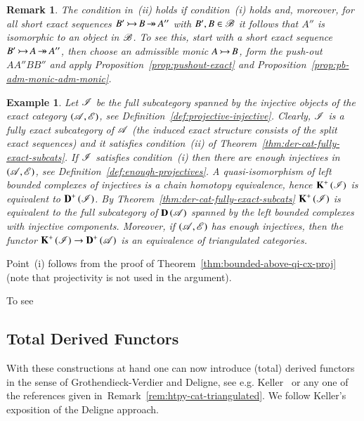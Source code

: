 \documentclass[1p]{elsarticle}
\makeatletter
\renewenvironment{proof}[1][\proofname]{\par
  \pushQED{\qed}%
  \normalfont \topsep6\p@\@plus6\p@\relax
  \trivlist
  \item[\hskip\labelsep
        \scshape
    #1\@addpunct{.}]\ignorespaces
}{%
  \popQED\endtrivlist\@endpefalse
}
\theoremstyle{mythm}
\theoremstyle{mydef}
\newtheorem{Exm}[Thm]{Example}
\newtheorem{Rem}[Thm]{Remark}
\makeatother
\begin{document}
\begin{Rem}
  The condition in~(ii) holds if condition~(i) holds and, moreover,
  for all short exact sequences
  $B' \operatorname{\rightarrowtail} B \operatorname{\twoheadrightarrow} A''$ with $B',B \in \operatorname{\mathscr{B}}$ it follows that $A''$ is
  isomorphic to an object in $\operatorname{\mathscr{B}}$.
  To see this, start with a short exact sequence $B' \operatorname{\rightarrowtail} A
  \operatorname{\twoheadrightarrow} A''$, then choose an admissible monic $A \operatorname{\rightarrowtail} B$, form the
  push-out $AA''BB''$ and apply Proposition~\ref{prop:pushout-exact}
  and Proposition~\ref{prop:pb-adm-monic-adm-monic}.
\end{Rem}

\begin{Exm}
  Let $\operatorname{\mathscr{I}}$ be the full subcategory spanned by the \emph{injective}
  objects of the exact category $(\operatorname{\mathscr{A}},\operatorname{\mathscr{E}})$, see
  Definition~\ref{def:projective-injective}. Clearly, $\operatorname{\mathscr{I}}$ is
  a fully exact subcategory of $\operatorname{\mathscr{A}}$ (the induced exact structure
  consists of the split exact sequences) and it satisfies 
  condition~(ii) of Theorem~\ref{thm:der-cat-fully-exact-subcats}. If
  $\operatorname{\mathscr{I}}$ satisfies condition~(i) then there are 
  \emph{enough injectives} in $(\operatorname{\mathscr{A}},\operatorname{\mathscr{E}})$, see
  Definition~\ref{def:enough-projectives}. A quasi-isomorphism of
  left bounded complexes of injectives is a chain homotopy
  equivalence, hence $\operatorname{\mathbf{K}}^{+}{(\operatorname{\mathscr{I}})}$ is equivalent to
  $\operatorname{\mathbf{D}}^{+}{(\operatorname{\mathscr{I}})}$. By Theorem~\ref{thm:der-cat-fully-exact-subcats}
  $\operatorname{\mathbf{K}}^{+}{(\operatorname{\mathscr{I}})}$ is equivalent to the full subcategory of
  $\operatorname{\mathbf{D}}{(\operatorname{\mathscr{A}})}$ spanned by the left bounded complexes with injective
  components. Moreover, if $(\operatorname{\mathscr{A}},\operatorname{\mathscr{E}})$ has enough injectives, then
  the functor $\operatorname{\mathbf{K}}^{+}{(\operatorname{\mathscr{I}})} \to \operatorname{\mathbf{D}}^{+}{(\operatorname{\mathscr{A}})}$ is an equivalence
  of triangulated categories.
\end{Exm}
\begin{proof}
  Point~(i) follows from the proof of
  Theorem~\ref{thm:bounded-above-qi-cx-proj} (note that projectivity
  is not used in the argument).

  To see 
\end{proof}
\fi
\subsection{Total Derived Functors}
\label{sec:total-der-fct}

With these constructions at hand one can now introduce (total) derived
functors in the sense of Grothendieck-Verdier and Deligne, see e.g.
Keller~\cite[\S\S {13-15}]{MR1421815} or any one of the references
given in~Remark~\ref{rem:htpy-cat-triangulated}. We follow Keller's
exposition of the Deligne approach.
\end{document}
